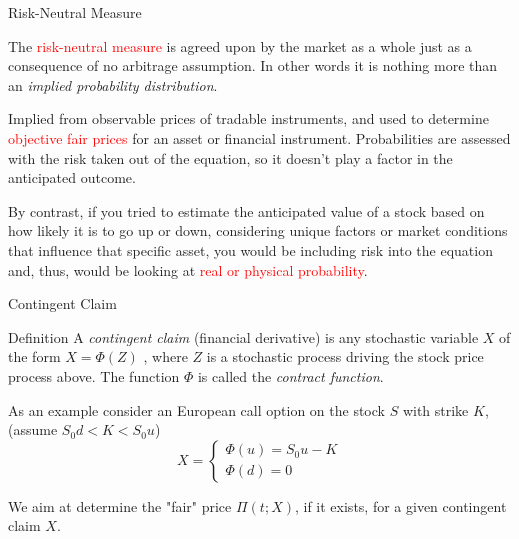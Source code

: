 \documentclass{beamer}
\begin{document}

\begin{frame}{Risk-Neutral Measure}

The \textcolor{red}{risk-neutral measure} is agreed upon by the market as a whole just as a consequence of no arbitrage assumption.
In other words it is nothing more than an \emph{implied probability distribution}.
\pause

Implied from observable prices of tradable instruments, and used to determine \textcolor{red}{objective fair prices} for an asset or financial instrument. Probabilities are assessed with the risk taken out of the equation, so it doesn’t play a factor in the anticipated outcome.
\pause

By contrast, if you tried to estimate the anticipated value of a stock based on how likely it is to go up or down, considering unique factors or market conditions that influence that specific asset, you would be including risk into the equation and, thus, would be looking at \textcolor{red}{real or physical probability}.
\end{frame}

\begin{frame}{Contingent Claim}
	\begin{block}{Definition}
	A \emph{contingent claim} (financial derivative) is any stochastic variable $X$ of the form $X=\Phi(Z)$ , where $Z$ is a stochastic process driving the stock price process above. 
The function $\Phi$ is called the \emph{contract function}.
	\end{block}
	As an example consider an European call option on the stock $S$ with strike $K$, (assume $S_0d < K < S_0u$)
	\begin{equation*}
		X = \begin{cases}
			\Phi(u) = S_0 u - K\\
			\Phi(d) = 0
		\end{cases}
	\end{equation*}

	We aim at determine the "fair" price $\Pi(t; X)$, if it exists, for a given contingent claim $X$.
\end{frame}
\end{document}
